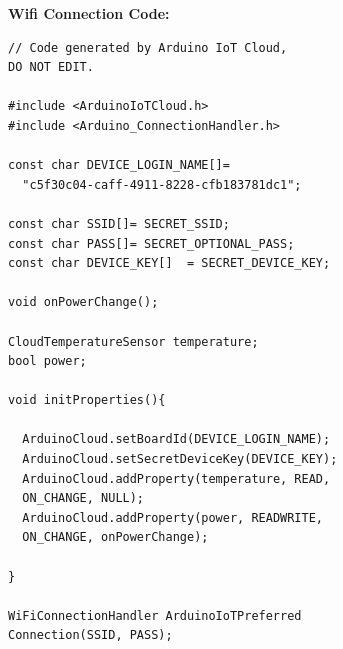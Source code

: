 \documentclass[conference]{IEEEtran}
\begin{document}
\textbf{Wifi Connection Code:}
\begin{verbatim}
// Code generated by Arduino IoT Cloud,
DO NOT EDIT.

#include <ArduinoIoTCloud.h>
#include <Arduino_ConnectionHandler.h>

const char DEVICE_LOGIN_NAME[]= 
  "c5f30c04-caff-4911-8228-cfb183781dc1";

const char SSID[]= SECRET_SSID;    
const char PASS[]= SECRET_OPTIONAL_PASS;
const char DEVICE_KEY[]  = SECRET_DEVICE_KEY; 

void onPowerChange();

CloudTemperatureSensor temperature;
bool power;

void initProperties(){

  ArduinoCloud.setBoardId(DEVICE_LOGIN_NAME);
  ArduinoCloud.setSecretDeviceKey(DEVICE_KEY);
  ArduinoCloud.addProperty(temperature, READ, 
  ON_CHANGE, NULL);
  ArduinoCloud.addProperty(power, READWRITE, 
  ON_CHANGE, onPowerChange);

}

WiFiConnectionHandler ArduinoIoTPreferred
Connection(SSID, PASS);
\end{verbatim}
\end{document}
